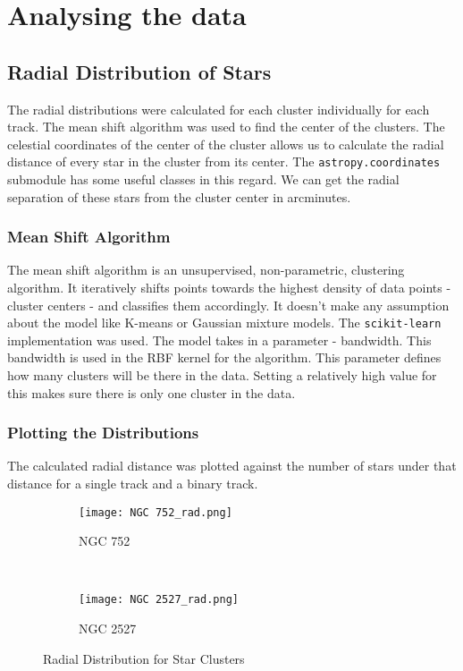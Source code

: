 \chapter{Analysing the data}\label{ch:ch3}

\section{Radial Distribution of Stars}
The radial distributions were calculated for each cluster individually for each track. The mean shift algorithm was used to find the center of the clusters. The celestial coordinates of the center of the cluster allows us to calculate the radial distance of every star in the cluster from its center. The \lstinline{astropy.coordinates} {}submodule has some useful classes in this regard. We can get the radial separation of these stars from the cluster center in arcminutes.

\subsection{Mean Shift Algorithm}
The mean shift algorithm is an unsupervised, non-parametric, clustering algorithm. It iteratively shifts points towards the highest density of data points - cluster centers - and classifies them accordingly. It doesn't make any assumption about the model like K-means or Gaussian mixture models. The \lstinline{scikit-learn} {}implementation was used. The model takes in a parameter - bandwidth. This bandwidth is used in the RBF kernel for the algorithm. This parameter defines how many clusters will be there in the data. Setting a relatively high value for this makes sure there is only one cluster in the data. 

\subsection{Plotting the Distributions}
The calculated radial distance was plotted against the number of stars under that distance for a single track and a binary track. 

\begin{figure}[H]
\centering
\begin{subfigure}[b]{0.4\textwidth}
  \centering
  \texttt{[image: NGC 752\_rad.png]}
  \caption{NGC 752}
  \label{fig:im4}
 \end{subfigure}
~
\begin{subfigure}[b]{0.4\textwidth}
  \centering
  \texttt{[image: NGC 2527\_rad.png]}
  \caption{NGC 2527}
  \label{fig:im5}
\end{subfigure}
\caption{Radial Distribution for Star Clusters}
\label{fig:sim1}
\end{figure}

